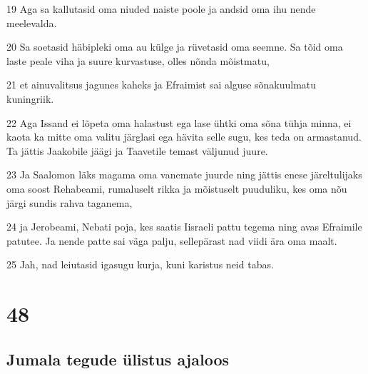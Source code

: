 \par 19 Aga sa kallutasid oma niuded naiste poole ja andsid oma ihu nende meelevalda.
\par 20 Sa soetasid häbipleki oma au külge ja rüvetasid oma seemne. Sa tõid oma laste peale viha ja suure kurvastuse, olles nõnda mõistmatu,
\par 21 et ainuvalitsus jagunes kaheks ja Efraimist sai alguse sõnakuulmatu kuningriik.
\par 22 Aga Issand ei lõpeta oma halastust ega lase ühtki oma sõna tühja minna, ei kaota ka mitte oma valitu järglasi ega hävita selle sugu, kes teda on armastanud. Ta jättis Jaakobile jäägi ja Taavetile temast väljunud juure.
\par 23 Ja Saalomon läks magama oma vanemate juurde ning jättis enese järeltulijaks oma soost Rehabeami, rumaluselt rikka ja mõistuselt puuduliku, kes oma nõu järgi sundis rahva taganema,
\par 24 ja Jerobeami, Nebati poja, kes saatis Iisraeli pattu tegema ning avas Efraimile patutee. Ja nende patte sai väga palju, sellepärast nad viidi ära oma maalt.
\par 25 Jah, nad leiutasid igasugu kurja, kuni karistus neid tabas.

\chapter{48}

\section*{Jumala tegude ülistus ajaloos}

